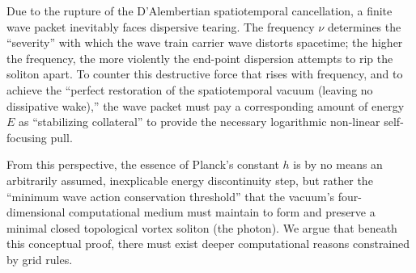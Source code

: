 \documentclass[12pt, a4paper]{article}
\begin{document}
Due to the rupture of the D'Alembertian spatiotemporal cancellation, a finite wave packet inevitably faces dispersive tearing. The frequency $\nu$ determines the ``severity'' with which the wave train carrier wave distorts spacetime; the higher the frequency, the more violently the end-point dispersion attempts to rip the soliton apart. To counter this destructive force that rises with frequency, and to achieve the ``perfect restoration of the spatiotemporal vacuum (leaving no dissipative wake),'' the wave packet must pay a corresponding amount of energy $E$ as ``stabilizing collateral'' to provide the necessary logarithmic non-linear self-focusing pull.

From this perspective, the essence of Planck's constant $h$ is by no means an arbitrarily assumed, inexplicable energy discontinuity step, but rather the ``minimum wave action conservation threshold'' that the vacuum's four-dimensional computational medium must maintain to form and preserve a minimal closed topological vortex soliton (the photon). We argue that beneath this conceptual proof, there must exist deeper computational reasons constrained by grid rules.
\end{document}
